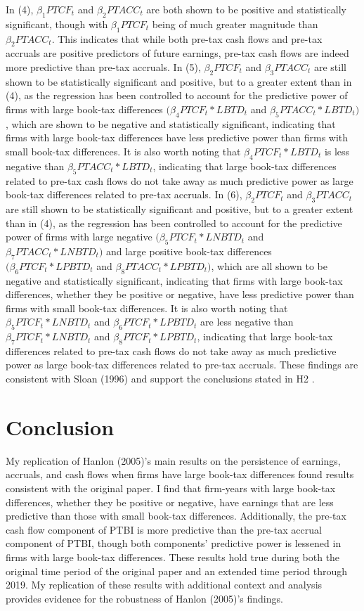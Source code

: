 \documentclass[12pt]{article}
\begin{document}
In (4), $\beta_1PTCF_t$ and $\beta_2PTACC_t$ are both shown to be positive and statistically significant, though with $\beta_1PTCF_t$ being of much greater magnitude than $\beta_2PTACC_t$. This indicates that while both pre-tax cash flows and pre-tax accruals are positive predictors of future earnings, pre-tax cash flows are indeed more predictive than pre-tax accruals. In (5), $\beta_2PTCF_t$ and $\beta_3PTACC_t$ are still shown to be statistically significant and positive, but to a greater extent than in (4), as the regression has been controlled to account for the predictive power of firms with large book-tax differences $(\beta_4PTCF_t * LBTD_t$ and $\beta_5PTACC_t * LBTD_t)$, which are shown to be negative and statistically significant, indicating that firms with large book-tax differences have less predictive power than firms with small book-tax differences. It is also worth noting that $\beta_4PTCF_t * LBTD_t$ is less negative than $\beta_5PTACC_t * LBTD_t$, indicating that large book-tax differences related to pre-tax cash flows do not take away as much predictive power as large book-tax differences related to pre-tax accruals. In (6), $\beta_2PTCF_t$ and $\beta_3PTACC_t$ are still shown to be statistically significant and positive, but to a greater extent than in (4), as the regression has been controlled to account for the predictive power of firms with large negative $(\beta_5PTCF_t * LNBTD_t$ and $\beta_7PTACC_t * LNBTD_t)$ and large positive book-tax differences $(\beta_6PTCF_t * LPBTD_t$ and $\beta_8PTACC_t * LPBTD_t)$, which are all shown to be negative and statistically significant, indicating that firms with large book-tax differences, whether they be positive or negative, have less predictive power than firms with small book-tax differences. It is also worth noting that $\beta_5PTCF_t * LNBTD_t$ and $\beta_6PTCF_t * LPBTD_t$ are less negative than $\beta_7PTCF_t * LNBTD_t$ and $\beta_8PTCF_t * LPBTD_t$, indicating that large book-tax differences related to pre-tax cash flows do not take away as much predictive power as large book-tax differences related to pre-tax accruals. These findings are consistent with Sloan (1996) and support the conclusions stated in H2 \citep{Sloan96}.

\section{Conclusion}
My replication of Hanlon (2005)’s main results on the persistence of earnings, accruals, and cash flows when firms have large book-tax differences found results consistent with the original paper. I find that firm-years with large book-tax differences, whether they be positive or negative, have earnings that are less predictive than those with small book-tax differences. Additionally, the pre-tax cash flow component of PTBI is more predictive than the pre-tax accrual component of PTBI, though both components’ predictive power is lessened in firms with large book-tax differences. These results hold true during both the original time period of the original paper and an extended time period through 2019. My replication of these results with additional context and analysis provides evidence for the robustness of Hanlon (2005)’s findings.
\end{document}

